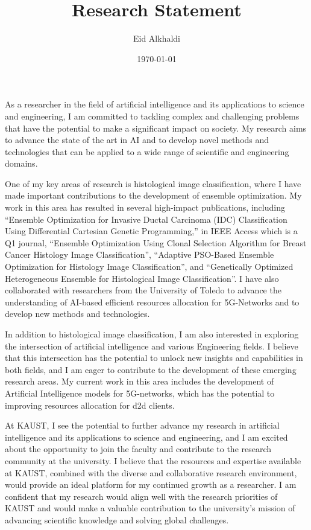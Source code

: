 \documentclass[11pt]{article}
\author{Eid Alkhaldi}
\date{\today}
\title{Research Statement}
\begin{document}
\maketitle
As a researcher in the field of artificial intelligence and its applications to science and engineering, I am committed to tackling complex and challenging problems that have the potential to make a significant impact on society. My research aims to advance the state of the art in AI and to develop novel methods and technologies that can be applied to a wide range of scientific and engineering domains.

One of my key areas of research is histological image classification, where I have made important contributions to the development of ensemble optimization. My work in this area has resulted in several high-impact publications, including “Ensemble Optimization for Invasive Ductal Carcinoma (IDC) Classification Using Differential Cartesian Genetic Programming,” in IEEE Access which is a Q1 journal, “Ensemble Optimization Using Clonal Selection Algorithm for Breast Cancer Histology Image Classification”, “Adaptive PSO-Based Ensemble Optimization for Histology Image Classification”, and “Genetically Optimized Heterogeneous Ensemble for Histological Image Classification”. I have also collaborated with researchers from the University of Toledo to advance the understanding of AI-based efficient resources allocation for 5G-Networks and to develop new methods and technologies.

In addition to histological image classification, I am also interested in exploring the intersection of artificial intelligence and various Engineering fields. I believe that this intersection has the potential to unlock new insights and capabilities in both fields, and I am eager to contribute to the development of these emerging research areas. My current work in this area includes the development of Artificial Intelligence models for 5G-networks, which has the potential to improving resources allocation for d2d clients.

At KAUST, I see the potential to further advance my research in artificial intelligence and its applications to science and engineering, and I am excited about the opportunity to join the faculty and contribute to the research community at the university. I believe that the resources and expertise available at KAUST, combined with the diverse and collaborative research environment, would provide an ideal platform for my continued growth as a researcher. I am confident that my research would align well with the research priorities of KAUST and would make a valuable contribution to the university's mission of advancing scientific knowledge and solving global challenges.
\end{document}
